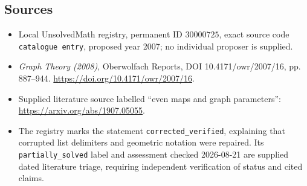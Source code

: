 \documentclass[11pt]{article}
\begin{document}
\subsection{Sources}
\begin{itemize}
\item Local UnsolvedMath registry, permanent ID \(30000725\), exact source code \texttt{catalogue entry}, proposed year 2007; no individual proposer is supplied.
\item \emph{Graph Theory (2008)}, Oberwolfach Reports, DOI 10.4171/owr/2007/16, pp. 887--944. \url{https://doi.org/10.4171/owr/2007/16}.
\item Supplied literature source labelled ``even maps and graph parameters'': \url{https://arxiv.org/abs/1907.05055}.
\item The registry marks the statement \texttt{corrected\_verified}, explaining that corrupted list delimiters and geometric notation were repaired. Its \texttt{partially\_solved} label and assessment checked 2026-08-21 are supplied dated literature triage, requiring independent verification of status and cited claims.
\end{itemize}
\end{document}
